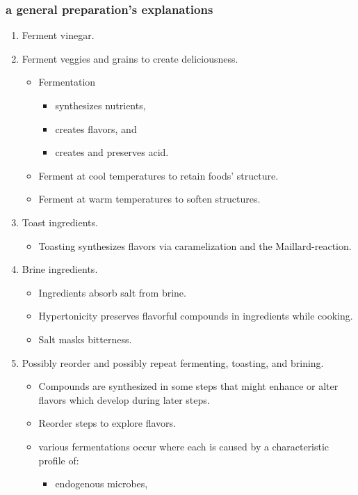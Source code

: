 \subsubsection*{a general preparation's explanations}
\begin{enumerate}
  \item Ferment vinegar.
  \item Ferment veggies and grains to create deliciousness.
    \begin{itemize}
      \item Fermentation
      \begin{itemize}
        \item synthesizes nutrients,
        \item creates flavors, and
        \item creates and preserves acid.
      \end{itemize}
      \item Ferment at cool temperatures to retain foods' structure.
      \item Ferment at warm temperatures to soften structures.
    \end{itemize}
  \item Toast ingredients.
    \begin{itemize}
      \item Toasting synthesizes flavors via caramelization and the Maillard-reaction.
    \end{itemize}
  \item Brine ingredients.
    \begin{itemize}
      \item Ingredients absorb salt from brine.
      \item Hypertonicity preserves flavorful compounds in ingredients while cooking.
      \item Salt masks bitterness.
    \end{itemize}
  \item Possibly reorder and possibly repeat fermenting, toasting, and brining.
    \begin{itemize}
      \item Compounds are synthesized in some steps that might enhance or alter flavors which develop during later steps.
      \item Reorder steps to explore flavors.
      \item various fermentations occur where each is caused by a characteristic profile of:
      \begin{itemize}
        \item endogenous microbes,

\end{itemize}
\end{itemize}
\end{enumerate}
